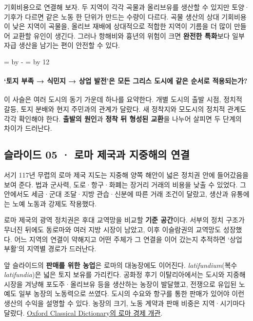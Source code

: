 \documentclass[10pt,a4paper]{article}
\newcommand{\ReserveQuestionSpace}{%
  \par\begingroup
  \dimen0=\pagegoal \advance\dimen0 by -\pagetotal
  \dimen2=\baselineskip \multiply\dimen2 by 12
  \ifdim\dimen0<\dimen2 \newpage\fi
  \endgroup}
\begin{document}
기회비용으로 연결해 보자. 두 지역이 각각 곡물과 올리브유를 생산할 수 있지만 토양·기후가 다르면 같은 노동 한 단위가 만드는 수량이 다르다. 곡물 생산의 상대 기회비용이 낮은 지역이 곡물을, 올리브 재배에 상대적으로 적합한 지역이 기름을 더 많이 만들어 교환할 유인이 생긴다. 그러나 항해비와 흉년의 위험이 크면 \textbf{완전한 특화}보다 일부 자급 생산을 남기는 편이 안전할 수 있다.\par

\ReserveQuestionSpace
\paragraph{‘토지 부족 → 식민지 → 상업 발전’은 모든 그리스 도시에 같은 순서로 적용되는가?}
이 사슬은 여러 도시의 동기 가운데 하나를 요약한다. 개별 도시의 출발 시점, 정치적 갈등, 토지 분배와 현지 주민과의 관계가 달랐다. 새 정착지와 모도시의 정치적 관계도 각각 확인해야 한다. \textbf{출발의 원인}과 \textbf{정착 뒤 형성된 교환}을 나누어 살피면 두 단계의 차이가 드러난다.\par

\subsection{슬라이드 05 · 로마 제국과 지중해의 연결}
서기 117년 무렵의 로마 제국 지도는 지중해 양쪽 해안이 넓은 정치권 안에 들어갔음을 보여 준다. 법과 군사력, 도로·항구·화폐는 장거리 거래의 비용을 낮출 수 있었다. 그 안에서도 세금·군대 조달·지방 관습·신분에 따른 거래 조건이 달랐고, 생산과 유통에는 노예 노동과 강제도 작용했다.\par

로마 제국의 광역 정치권은 후대 교역망을 비교할 \textbf{기준 공간}이다. 서부의 정치 구조가 무너진 뒤에도 동로마와 여러 지방 시장이 남았고, 이후 이슬람권의 교역망도 성장했다. 어느 지역의 연결이 약해지고 어떤 주체가 그 연결을 이어 갔는지 추적하면 ‘상업 부활’의 지역별 경로가 드러난다.\par

앞 슬라이드의 \textbf{판매를 위한 농업}은 로마의 대농장에도 이어진다. \emph{latifundium}(복수 \emph{latifundia})은 넓은 토지 보유를 가리킨다. 공화정 후기 이탈리아에서는 도시와 지중해 시장을 겨냥해 포도주·올리브유 등을 생산하는 농장이 발달했고, 전쟁으로 유입된 노예도 일부 농장의 노동력으로 쓰였다. 도시의 수요와 항구를 통한 판매가 있어야 이런 생산의 수익을 설명할 수 있다. 농장의 크기, 노동 계약과 판매 비중은 지역·시기마다 달랐다. \href{https://academic.oup.com/edited-volume/61673/chapter/548736448}{Oxford Classical Dictionary의 로마 경제 개관}.\par
\end{document}
